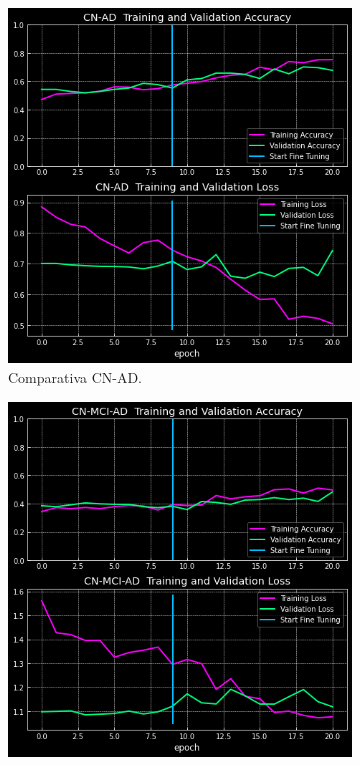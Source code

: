 \begin{figure}[H]
    \centering
    \begin{subfigure}{0.45\textwidth}
        \includegraphics[width=\textwidth]{./imgs/resultados/axial/CN_AD_output_AXIAL}
        \caption{Comparativa CN-AD. }
        \label{fig:axial-cn-ad}
    \end{subfigure}
    \hspace*{\fill}
    \begin{subfigure}{0.45\textwidth}
        \includegraphics[width=\textwidth]{./imgs/resultados/axial/CN_MCI_AD_output_AXIAL}

\end{subfigure}
\end{figure}
